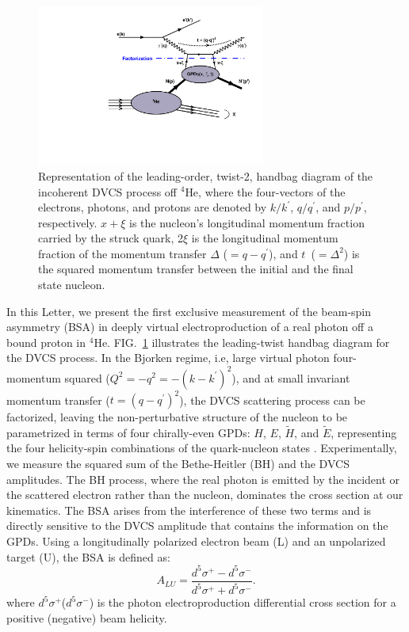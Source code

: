 \documentclass[twocolumn,nofootinbib,showpacs,prl,superscriptaddress,secnumarabic,amssymb,nobibnotes,aps,floatfix]{revtex4}
\begin{document}
\begin{figure}[tb]
\includegraphics[width=7.5cm]{figs/handbag_incoherent.pdf}
\caption{Representation of the leading-order, twist-2, handbag diagram of the 
   incoherent DVCS process off $^4$He, where the four-vectors of the electrons, 
   photons, and protons are denoted by $k/k^\prime$, $q/q^\prime$, and 
   $p/p^\prime$, respectively. $x+\xi$ is the nucleon’s longitudinal momentum 
   fraction carried by the struck quark, 2$\xi$ is the longitudinal momentum 
   fraction of the momentum transfer $\Delta$ ($= q - q^\prime$), and 
   $t$~($=\Delta^2$) is the squared momentum transfer between the initial and
   the final state nucleon.}
\label{fig:diags}
\end{figure}

In this Letter, we present the first exclusive measurement of the beam-spin 
asymmetry (BSA) in deeply virtual electroproduction of a real photon off a bound 
proton in $^{4}$He. FIG.~\ref{fig:diags} illustrates the leading-twist handbag 
diagram for the DVCS process. In the Bjorken regime, i.e, large virtual photon 
four-momentum squared ($Q^{2}=-q^2=-(k-k^\prime)^2$), and at small invariant 
momentum transfer ($t=(q-q^\prime)^2$), the DVCS scattering process can be 
factorized, leaving the non-perturbative structure of the nucleon to be 
parametrized in terms of four chirally-even GPDs: $H$, $E$, $\widetilde{H}$, 
and $\widetilde{E}$, representing the four helicity-spin combinations of the 
quark-nucleon states \cite{Freund_Collins,Ji_Osborne}. Experimentally, we 
measure the squared sum of the Bethe-Heitler (BH) and the DVCS amplitudes. The 
BH process, where the real photon is emitted by the incident or the scattered 
electron rather than the nucleon, dominates the cross section at our 
kinematics. The BSA arises from the interference of these two terms and is 
directly sensitive to the DVCS amplitude that contains the information on the 
GPDs. Using a longitudinally polarized electron beam (L) and an unpolarized 
target (U), the BSA is defined as:
\begin{equation}
  A_{LU} = \frac{d^{5}\sigma^{+} - d^{5}\sigma^{-} }
                {d^{5}\sigma^{+} + d^{5}\sigma^{-}}.
    \label{BSA_equation}
  \end{equation}
where $d^{5}\sigma^{+}$($d^{5}\sigma^{-}$) is the photon electroproduction 
differential cross section for a positive (negative) beam helicity. 
\end{document}
